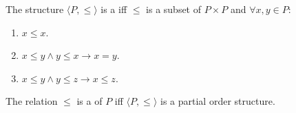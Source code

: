 The structure $\langle P, \leq \rangle$ is a  iff $\leq$ is a subset of $P \times P$ and $\forall x, y \in P$:
\begin{enumerate}
\item $x \leq x$.
\item $x \leq y \land y \leq x \rightarrow x = y$.
\item $x \leq y \land y \leq z \rightarrow x \leq z$.
\end{enumerate}
The relation $\leq$ is a  of $P$ iff $\langle P, \leq \rangle$ is a partial order structure.
